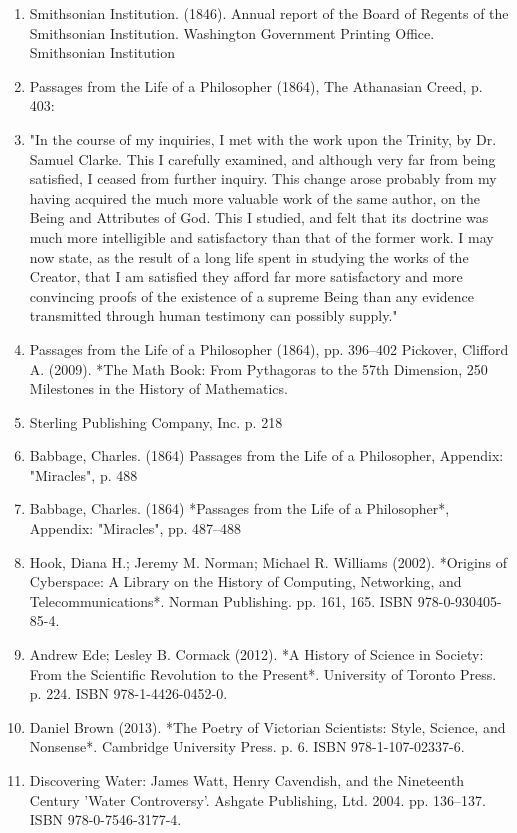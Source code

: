 \begin{enumerate}
\item Smithsonian Institution. (1846). Annual report of the Board of Regents of the Smithsonian Institution. Washington Government Printing Office. Smithsonian Institution  
\item Passages from the Life of a Philosopher (1864), The Athanasian Creed, p. 403:  
\item "In the course of my inquiries, I met with the work upon the Trinity, by Dr. Samuel Clarke. This I carefully examined, and although very far from being satisfied, I ceased from further inquiry. This change arose probably from my having acquired the much more valuable work of the same author, on the Being and Attributes of God. This I studied, and felt that its doctrine was much more intelligible and satisfactory than that of the former work. I may now state, as the result of a long life spent in studying the works of the Creator, that I am satisfied they afford far more satisfactory and more convincing proofs of the existence of a supreme Being than any evidence transmitted through human testimony can possibly supply."  
\item Passages from the Life of a Philosopher (1864), pp. 396–402  
Pickover, Clifford A. (2009). *The Math Book: From Pythagoras to the 57th Dimension, 250 Milestones in the History of Mathematics.
\item Sterling Publishing Company, Inc. p. 218  
\item Babbage, Charles. (1864) Passages from the Life of a Philosopher, Appendix: "Miracles", p. 488  
\item Babbage, Charles. (1864) *Passages from the Life of a Philosopher*, Appendix: "Miracles", pp. 487–488  
\item Hook, Diana H.; Jeremy M. Norman; Michael R. Williams (2002). *Origins of Cyberspace: A Library on the History of Computing, Networking, and Telecommunications*. Norman Publishing. pp. 161, 165. ISBN 978-0-930405-85-4.  
\item Andrew Ede; Lesley B. Cormack (2012). *A History of Science in Society: From the Scientific Revolution to the Present*. University of Toronto Press. p. 224. ISBN 978-1-4426-0452-0.  
\item Daniel Brown (2013). *The Poetry of Victorian Scientists: Style, Science, and Nonsense*. Cambridge University Press. p. 6. ISBN 978-1-107-02337-6.  
\item Discovering Water: James Watt, Henry Cavendish, and the Nineteenth Century 'Water Controversy'. Ashgate Publishing, Ltd. 2004. pp. 136–137. ISBN 978-0-7546-3177-4.  

\end{enumerate}
